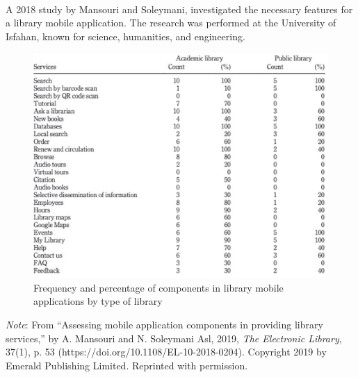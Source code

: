     \paragraph{}
    A 2018 study by Mansouri and  Soleymani, investigated the necessary features for a library mobile application. The research was performed at the University of Isfahan, known for science, humanities, and engineering.
    \begin{figure}[H]
        \centering
        \includegraphics[width = \textwidth, height = \textheight, keepaspectratio]{assets/img/Accessing Mobile Applications.png}
        \caption{Frequency and percentage of components in library mobile applications by type of library}
        \label{fig:freq_and_per_comp_lib_mob_app}
    \end{figure}
    \noindent{} \textit{Note}: From “Assessing mobile application components in providing library services,” by A. Mansouri and N. Soleymani Asl, 2019, \textit{The Electronic Library}, 37(1), p. 53 (https://doi.org/10.1108/EL-10-2018-0204). Copyright 2019 by Emerald Publishing Limited. Reprinted with permission.
    
    
